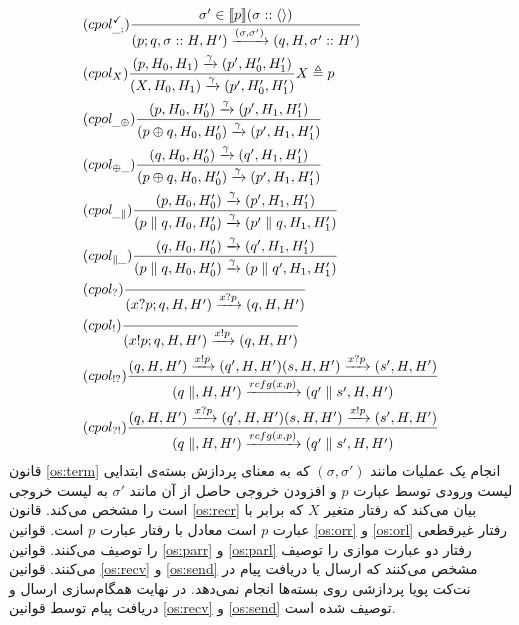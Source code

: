 \begin{align}
     & (cpol^{\checkmark}_{\_;})
    \frac{\sigma' \in \llbracket p \rrbracket(\sigma::\langle  \rangle)}
    {(p;q,\sigma::H,H')\xrightarrow{(\sigma,\sigma')}
    (q,H,\sigma'::H') }    \label{os:term}                                 \\
     & (cpol_X)
    \frac{(p,H_0,H_1)\xrightarrow{\gamma}(p',H_0',H_1')}
    {(X,H_0,H_1)\xrightarrow{\gamma}(p',H_0',H_1')}
    X \triangleq p         \label{os:recr}                                 \\
     & (cpol_{\_\oplus})
    \frac{(p,H_0,H_0')\xrightarrow{\gamma}(p',H_1,H_1')}
    {(p\oplus q,H_0,H_0')\xrightarrow{\gamma}(p',H_1,H_1')}
    \label{os:orr}                                                         \\
     & (cpol_{\oplus\_})
    \frac{(q,H_0,H_0')\xrightarrow{\gamma}(q',H_1,H_1')}
    {(p\oplus q,H_0,H_0')\xrightarrow{\gamma}(p',H_1,H_1')} \label{os:orl} \\
     & (cpol_{\_\parallel})
    \frac{(p,H_0,H_0')\xrightarrow{\gamma}(p',H_1,H_1')}
    {(p\parallel q,H_0,H_0')\xrightarrow{\gamma}(p' \parallel q,H_1,H_1')}
    \label{os:parr}                                                        \\
     & (cpol_{\parallel\_})
    \frac{(q,H_0,H_0')\xrightarrow{\gamma}(q',H_1,H_1')}
    {(p\parallel q,H_0,H_0')\xrightarrow{\gamma}(p \parallel q',H_1,H_1')}
    \label{os:parl}                                                        \\
     & (cpol_?)
    \frac{}
    {(x?p;q,H,H')\xrightarrow{x?p}(q,H,H')}
    \label{os:recv}                                                        \\
     & (cpol_!)
    \frac{}
    {(x!p;q,H,H')\xrightarrow{x!p}(q,H,H')}
    \label{os:send}                                                        \\
     & (cpol_{!?})
    \frac{
        (q,H,H') \xrightarrow{x!p}(q',H,H')
        (s,H,H') \xrightarrow{x?p} (s',H,H')
    }{
        (q\parallel,H,H') \xrightarrow{rcfg(x,p)} (q'\parallel s',H,H')
    }     \label{os:syncr}                                                 \\
     & (cpol_{?!})
    \frac{
        (q,H,H') \xrightarrow{x?p}(q',H,H')
        (s,H,H') \xrightarrow{x!p} (s',H,H')
    }{
        (q\parallel,H,H') \xrightarrow{rcfg(x,p)} (q'\parallel s',H,H')
    } \label{os:syncl}
\end{align}
قانون 
\ref{os:term}
انجام یک عملیات مانند
$(\sigma,\sigma')$
که به معنای
پردازش بسته‌ی ابتدایی لیست ورودی توسط عبارت 
$p$
و افزودن خروجی حاصل از آن مانند 
$\sigma'$
به لیست خروجی است را مشخص می‌کند.
قانون 
\ref{os:recr}
بیان می‌کند که رفتار متغیر 
$X$
که برابر با عبارت 
$p$
است معادل با رفتار عبارت 
$p$
است.
قوانین 
\ref{os:orr}
و
\ref{os:orl}
رفتار غیرقطعی را توصیف می‌کنند.
قوانین
\ref{os:parr}
و
\ref{os:parl}
رفتار دو عبارت موازی را توصیف می‌کنند.
قوانین
\ref{os:recv}
و
\ref{os:send}
مشخص می‌کنند که ارسال یا دریافت پیام در نت‌کت پویا پردازشی روی بسته‌ها انجام نمی‌دهد.
در نهایت همگام‌سازی
ارسال و دریافت پیام توسط قوانین 
\ref{os:recv}
و
\ref{os:send}
توصیف شده است.

